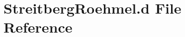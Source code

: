 \hypertarget{StreitbergRoehmel_8d}{
\section{Streitberg\-Roehmel.d File Reference}
\label{StreitbergRoehmel_8d}
}
